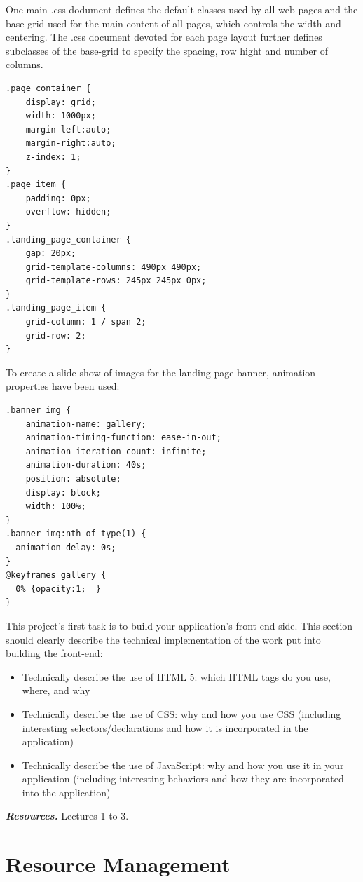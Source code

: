 \documentclass[letterpaper,twocolumn]{article}
\newcommand{\myparagraph}[1]{\vspace{0.1cm}\noindent \textbf{\textit{#1.}}}
\begin{document}
One main .css dodument defines the default classes used by all web-pages and the base-grid used for the main content of all pages, which controls the width and centering. The .css document devoted for each page layout further defines subclasses of the base-grid to specify the spacing, row hight and number of columns. 

\begin{verbatim}
.page_container {
	display: grid;
	width: 1000px;
	margin-left:auto;
	margin-right:auto;
	z-index: 1;
}
.page_item {
	padding: 0px;
	overflow: hidden;
}
.landing_page_container {
	gap: 20px;
	grid-template-columns: 490px 490px;
	grid-template-rows: 245px 245px 0px;
}
.landing_page_item {
	grid-column: 1 / span 2;
	grid-row: 2;
}
\end{verbatim}
To create a slide show of images for the landing page banner, animation properties have been used:

\begin{verbatim}
.banner img {
	animation-name: gallery;
	animation-timing-function: ease-in-out;
	animation-iteration-count: infinite;
	animation-duration: 40s;
	position: absolute;
	display: block;
	width: 100%;
}
.banner img:nth-of-type(1) {
  animation-delay: 0s;
}
@keyframes gallery {
  0% {opacity:1;  }
}
\end{verbatim}

This project's first task is to build your application's front-end side.
This section should clearly describe the technical implementation of the work put into building the front-end:

\begin{itemize}
    \item Technically describe the use of HTML 5: which HTML tags do you use, where, and why
    \item Technically describe the use of CSS: why and how you use CSS (including interesting selectors/declarations and how it is incorporated in the application)
    \item Technically describe the use of JavaScript: why and how you use it in your application (including interesting behaviors and how they are incorporated into the application)
\end{itemize}

\myparagraph{Resources} Lectures 1 to 3.

\section{Resource Management}
\end{document}
